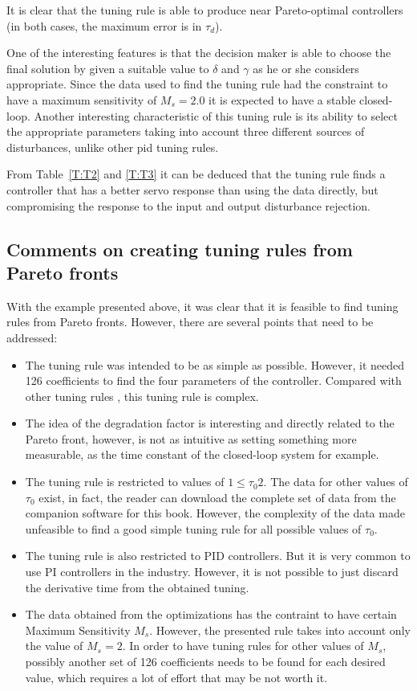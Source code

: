 It is clear that the tuning rule is able to produce near Pareto-optimal controllers (in both cases, the maximum error is in $\tau_d$).

One of the interesting features is that the decision maker is able to choose the final solution by given a suitable value to $\delta$ and $\gamma$ as he or she considers appropriate. Since the data used to find the tuning rule had the constraint to have a maximum sensitivity of $M_s =2.0$ it is expected to have a stable closed-loop. Another interesting characteristic of this tuning rule is its ability to select the appropriate parameters taking into account three different sources of disturbances, unlike other \gls{pid} tuning rules.

From Table~\ref{T:T2} and \ref{T:T3} it can be deduced that the tuning rule finds a controller that has a better servo response than using the data directly, but compromising the response to the input and output disturbance rejection.

\subsection{Comments on creating tuning rules from Pareto fronts}
\label{sec:TuningRules}
With the example presented above, it was clear that it is feasible to find tuning rules from Pareto fronts. However, there are several points that need to be addressed:
\begin{itemize}
	\item The tuning rule was intended to be as simple as possible. However, it needed 126 coefficients to find the four parameters of the controller. Compared with other tuning rules \citet{odwyer2006}, this tuning rule is complex.
	\item The idea of the degradation factor is interesting and directly related to the Pareto front, however, is not as intuitive as setting something more measurable, as the time constant of the closed-loop system for example.
	\item The tuning rule is restricted to values of $1 \leq \tau_0 2$. The data for other values of $\tau_0$ exist, in fact, the reader can download the complete set of data from the companion software for this book. However, the complexity of the data made unfeasible to find a good simple tuning rule for all possible values of $\tau_0$.
	\item The tuning rule is also restricted to PID controllers. But it is very common to use PI controllers in the industry. However, it is not possible to just discard the derivative time from the obtained tuning.
	\item The data obtained from the optimizations has the contraint to have certain Maximum Sensitivity $M_s$. However, the presented rule takes into account only the value of $M_s = 2$. In order to have tuning rules for other values of $M_s$, possibly another set of 126 coefficients needs to be found for each desired value, which requires a lot of effort that may be not worth it.
\end{itemize}


